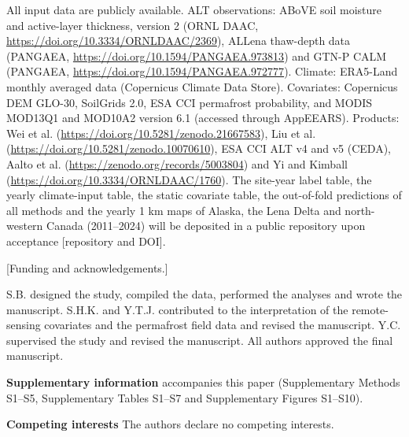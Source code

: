 \ifnum{}
All input data are publicly available. ALT observations: ABoVE soil moisture and active-layer thickness, version 2 (ORNL DAAC, \url{https://doi.org/10.3334/ORNLDAAC/2369}), ALLena thaw-depth data (PANGAEA, \url{https://doi.org/10.1594/PANGAEA.973813}) and GTN-P CALM (PANGAEA, \url{https://doi.org/10.1594/PANGAEA.972777}). Climate: ERA5-Land monthly averaged data (Copernicus Climate Data Store). Covariates: Copernicus DEM GLO-30, SoilGrids 2.0, ESA CCI permafrost probability, and MODIS MOD13Q1 and MOD10A2 version 6.1 (accessed through AppEEARS). Products: Wei et al. (\url{https://doi.org/10.5281/zenodo.21667583}), Liu et al. (\url{https://doi.org/10.5281/zenodo.10070610}), ESA CCI ALT v4 and v5 (CEDA), Aalto et al. (\url{https://zenodo.org/records/5003804}) and Yi and Kimball (\url{https://doi.org/10.3334/ORNLDAAC/1760}). The site-year label table, the yearly climate-input table, the static covariate table, the out-of-fold predictions of all methods and the yearly 1 km maps of Alaska, the Lena Delta and north-western Canada (2011--2024) will be deposited in a public repository upon acceptance [repository and DOI].
\fi

\ifnum{}
[Funding and acknowledgements.]

S.B. designed the study, compiled the data, performed the analyses and wrote the manuscript. S.H.K. and Y.T.J. contributed to the interpretation of the remote-sensing covariates and the permafrost field data and revised the manuscript. Y.C. supervised the study and revised the manuscript. All authors approved the final manuscript.

\textbf{Supplementary information} accompanies this paper (Supplementary Methods S1--S5, Supplementary Tables S1--S7 and Supplementary Figures S1--S10).

\textbf{Competing interests} The authors declare no competing interests.
\fi
